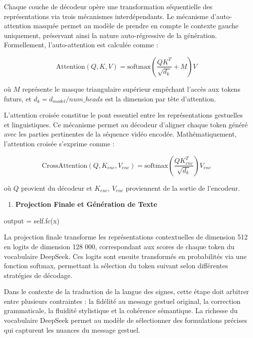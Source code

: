 \documentclass[12pt]{article}
\providecommand{\tightlist}{%
      \setlength{\itemsep}{0pt}\setlength{\parskip}{0pt}}
\newenvironment{Shaded}{}{}
\newcommand{\NormalTok}[1]{{#1}}
\newcommand{\VariableTok}[1]{\textcolor[rgb]{0.10,0.09,0.49}{{#1}}}
\newcommand{\OperatorTok}[1]{\textcolor[rgb]{0.40,0.40,0.40}{{#1}}}
\begin{document}
Chaque couche de décodeur opère une transformation séquentielle des
représentations via trois mécanismes interdépendants. Le mécanisme
d'auto-attention masquée permet au modèle de prendre en compte le
contexte gauche uniquement, préservant ainsi la nature auto-régressive
de la génération. Formellement, l'auto-attention est calculée comme :

\[
\text{Attention}(Q, K, V) = \text{softmax}\left(\frac{QK^T}{\sqrt{d_k}} + M\right)V
\]

où \(M\) représente le masque triangulaire supérieur empêchant l'accès
aux tokens futurs, et \(d_k = d_{model} / num\_heads\) est la dimension
par tête d'attention.

L'attention croisée constitue le pont essentiel entre les
représentations gestuelles et linguistiques. Ce mécanisme permet au
décodeur d'aligner chaque token généré avec les parties pertinentes de
la séquence vidéo encodée. Mathématiquement, l'attention croisée
s'exprime comme :

\[
\text{CrossAttention}(Q, K_{enc}, V_{enc}) = \text{softmax}\left(\frac{QK_{enc}^T}{\sqrt{d_k}}\right)V_{enc}
\]

où \(Q\) provient du décodeur et \(K_{enc}\), \(V_{enc}\) proviennent de
la sortie de l'encodeur.

\begin{enumerate}
\def\labelenumi{\arabic{enumi}.}
\setcounter{enumi}{5}
\tightlist
\item
  \textbf{Projection Finale et Génération de Texte}
\end{enumerate}

\begin{Shaded}
\begin{Highlighting}[]
\NormalTok{output }\OperatorTok{=} \VariableTok{self}\NormalTok{.fc(x)}
\end{Highlighting}
\end{Shaded}

La projection finale transforme les représentations contextuelles de
dimension 512 en logits de dimension 128 000, correspondant aux scores
de chaque token du vocabulaire DeepSeek. Ces logits sont ensuite
transformés en probabilités via une fonction softmax, permettant la
sélection du token suivant selon différentes stratégies de décodage.

Dans le contexte de la traduction de la langue des signes, cette étape
doit arbitrer entre plusieurs contraintes : la fidélité au message
gestuel original, la correction grammaticale, la fluidité stylistique et
la cohérence sémantique. La richesse du vocabulaire DeepSeek permet au
modèle de sélectionner des formulations précises qui capturent les
nuances du message gestuel.
\end{document}
